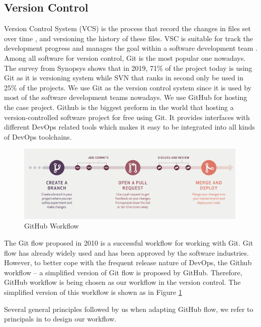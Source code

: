 \subsection{Version Control}
Version Control System (VCS) is the process that record the changes in files set over time \cite{GitAbout93:online}, and versioning the history of these files. VSC is suitable for track the development progress and manages the goal within a software development team \cite{loeliger2012version}. Among all software for version control, Git is the most popular one nowadays. The survey \cite{CompareR31:online} from Synopsys shows that in 2019, 71\% of the project today is using Git as it is versioning system while SVN that ranks in second only be used in 25\% of the projects. We use Git as the version control system since it is used by most of the software development teams nowadays. We use GitHub for hosting the case project. Github is the biggest preform in the world that hosting a version-controlled software project for free using Git. It provides interfaces with different DevOps related tools which makes it easy to be integrated into all kinds of DevOps toolchains.
\begin{figure}[h]
\centering
\includegraphics[width=0.99\textwidth]{pics/git.png}
\caption{GitHub Workflow \cite{guides2013understanding}}
\label{fig:git}
\end{figure}
\par
The Git flow \cite{driessen2010successful} proposed in 2010 is a successful workflow for working with Git. Git flow has already widely used and has been approved by the software industries. However, to better cope with the frequent release nature of DevOps, the Github workflow -- a simplified version of Git flow is proposed by GitHub.
Therefore, GitHub workflow \cite{chacongithub} is being chosen as our workflow in the version control. The simplified version of this workflow is shown as in Figure \ref{fig:git}
\par
Several general principles followed by us when adapting GitHub flow, we refer to principals in \cite{chacongithub} to design our workflow.
